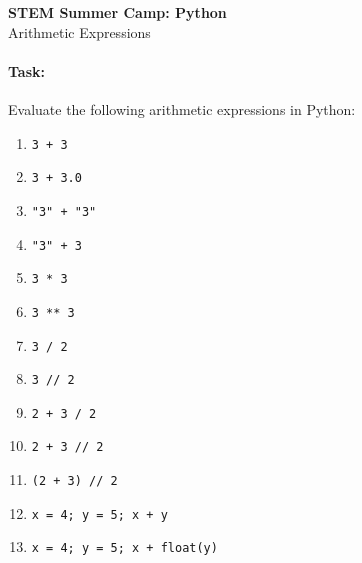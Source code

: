 \documentclass[11pt]{article}
\begin{document}
    \begin{center}

        \large\textbf{STEM Summer Camp: Python} \\
        Arithmetic Expressions \\

    \end{center}

    \paragraph{Task:} Evaluate the following arithmetic expressions in
    Python:  
    
    \begin{enumerate}

        \item \tt{3 + 3}

        \item \tt{3 + 3.0}

        \item \tt{"3" + "3"}

        \item \tt{"3" + 3}

        \item \tt{3 * 3}

        \item \tt{3 ** 3}

        \item \tt{3 / 2}

        \item \tt{3 // 2}

        \item \tt{2 + 3 / 2}

        \item \tt{2 + 3 // 2}

        \item \tt{(2 + 3) // 2}

        \item \tt{x = 4; y = 5; x + y}

        \item \tt{x = 4; y = 5; x + float(y)}

    \end{enumerate}
\end{document}
